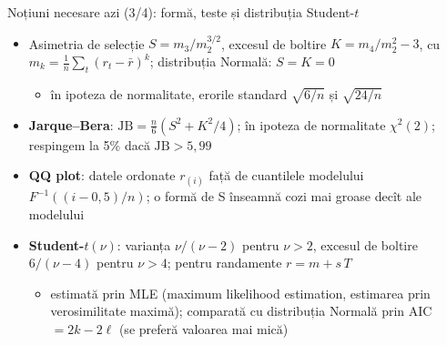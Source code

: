 \begin{frame}{Noțiuni necesare azi (3/4): formă, teste și distribuția Student-$t$}
\itemsize{\footnotesize}
\begin{itemize}
    \item Asimetria de selecție $S = m_3/m_2^{3/2}$, excesul de boltire $K = m_4/m_2^2 - 3$, cu $m_k = \frac1n\sum_t (r_t - \bar r)^k$; distribuția Normală: $S = K = 0$
    \begin{itemize}
        \item în ipoteza de normalitate, erorile standard $\sqrt{6/n}$ și $\sqrt{24/n}$
    \end{itemize}
    \item \textbf{Jarque--Bera}: $\text{JB} = \frac{n}{6}(S^2 + K^2/4)$; în ipoteza de normalitate $\chi^2(2)$; respingem la 5\% dacă $\text{JB} > 5{,}99$
    \item \textbf{QQ plot}: datele ordonate $r_{(i)}$ față de cuantilele modelului $F^{-1}((i - 0{,}5)/n)$; o formă de S înseamnă cozi mai groase decît ale modelului
    \item \textbf{Student-$t(\nu)$}: varianța $\nu/(\nu-2)$ pentru $\nu > 2$, excesul de boltire $6/(\nu - 4)$ pentru $\nu > 4$; pentru randamente $r = m + s\,T$
    \begin{itemize}
        \item estimată prin MLE (maximum likelihood estimation, estimarea prin verosimilitate maximă); comparată cu distribuția Normală prin AIC $= 2k - 2\ell$ (se preferă valoarea mai mică)
    \end{itemize}
\end{itemize}
\end{frame}

